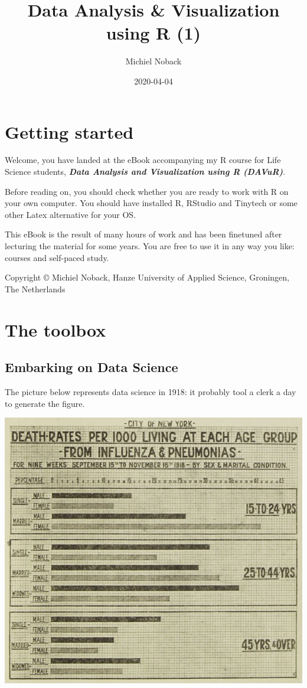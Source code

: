 \documentclass[]{book}
\title{Data Analysis \& Visualization using R (1)}
\author{Michiel Noback}
\date{2020-04-04}
\begin{document}
\maketitle

{
\setcounter{tocdepth}{1}
\tableofcontents
}
\hypertarget{getting-started}{%
\chapter{Getting started}\label{getting-started}}

Welcome, you have landed at the eBook accompanying my R course for Life Science students, \textbf{\emph{Data Analysis and Visualization using R (DAVuR)}}.

Before reading on, you should check whether you are ready to work with R on your own computer.
You should have installed R, RStudio and Tinytech or some other Latex alternative for your OS.

This eBook is the result of many hours of work and has been finetuned after lecturing the material for some years.
You are free to use it in any way you like: courses and self-paced study.

Copyright © Michiel Noback, Hanze University of Applied Science, Groningen, The Netherlands

\hypertarget{toolbox}{%
\chapter{The toolbox}\label{toolbox}}

\hypertarget{embarking-on-data-science}{%
\section{Embarking on Data Science}\label{embarking-on-data-science}}

The picture below represents data science in 1918: it probably tool a clerk a day to generate the figure.

\includegraphics{figures/influenza_1918_new_york.jpg}
\end{document}
